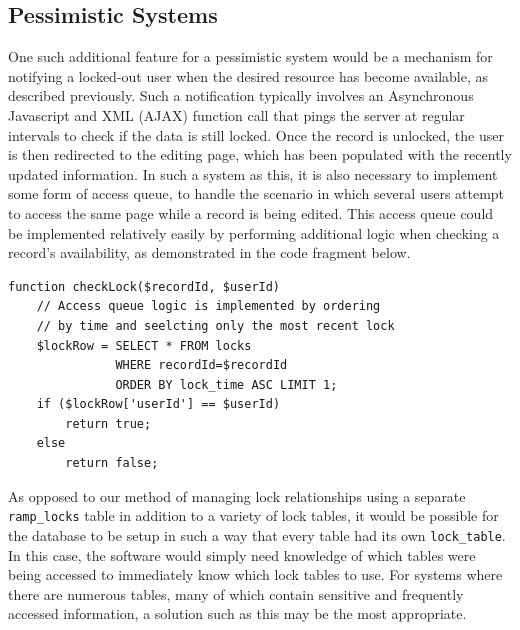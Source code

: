 \documentclass[12pt]{article}
\newcommand{\code}[1]{\texttt{#1}}
\begin{document}
\subsection{Pessimistic Systems}
One such additional feature for a pessimistic system would be a mechanism for notifying a locked-out user when the desired resource has become available, as described previously. Such a notification typically involves an Asynchronous Javascript and XML (AJAX) function call that pings the server at regular intervals to check if the data is still locked. Once the record is unlocked, the user is then redirected to the editing page, which has been populated with the recently updated information. In such a system as this, it is also necessary to implement some form of access queue, to handle the scenario in which several users attempt to access the same page while a record is being edited. This access queue could be implemented relatively easily by performing additional logic when checking a record's availability, as demonstrated in the code fragment below.

\begin{framed}
\begin{spacing}{1.0}
\begin{verbatim}
function checkLock($recordId, $userId)
    // Access queue logic is implemented by ordering 
    // by time and seelcting only the most recent lock
    $lockRow = SELECT * FROM locks
               WHERE recordId=$recordId 
               ORDER BY lock_time ASC LIMIT 1;
    if ($lockRow['userId'] == $userId)
        return true;
    else
        return false;

\end{verbatim}
\end{spacing}
\end{framed}

As opposed to our method of managing lock relationships using a separate \code{ramp\_locks} table in addition to a variety of lock tables, it would be possible for the database to be setup in such a way that every table had its own \code{lock\_table}. In this case, the software would simply need knowledge of which tables were being accessed to immediately know which lock tables to use. For systems where there are numerous tables, many of which contain sensitive and frequently accessed information, a solution such as this may be the most appropriate.
\end{document}
